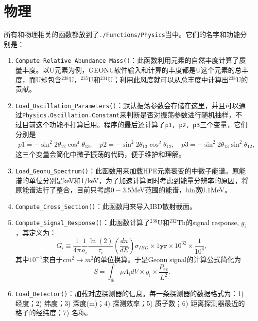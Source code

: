 		\section{物理}
			所有和物理相关的函数都放到了\texttt{./Functions/Physics}当中。它们的名字和功能分别是：
				\begin{enumerate}
					\item \texttt{Compute\_Relative\_Abundance\_Mass()}：此函数利用元素的自然丰度计算了质量丰度。以U元素为例，GEONU软件输入和计算的丰度都是U这个元素的总丰度，而U却包含${}^{238}$U，${}^{235}$U和${}^{234}$U；利用此风度就可以从总丰度中计算出${}^{238}$U的贡献。
					\item \texttt{Load\_Oscillation\_Parameters()}：默认振荡参数会存储在这里，并且可以通过\texttt{Physics.Oscillation.Constant}来判断是否对振荡参数进行随机抽样，不过目前这个功能不打算启用。程序的最后还计算了\texttt{p1, p2, p3}三个变量，它们分别是
						\begin{align}
							 p1 = -\sin^2 2\theta_{12} \cos^4 \theta_{13},
							 \quad
							 p2 = -\sin^2 2\theta_{13} \cos^2 \theta_{12},
							 \quad
							 p3 = - \sin^2 2\theta_{13} \sin^2 \theta_{12},
						\end{align}
					这三个变量会简化中微子振荡的代码，便于维护和理解。
					\item \texttt{Load\_Geonu\_Spectrum()}：此函数用来加载HPE元素衰变的中微子能谱。原能谱的单位分别是keV和1/keV，为了加速计算同时考虑到能量分辨率的原因，将原能谱进行了整合，目前只考虑$0-3.5$MeV范围的能谱，bin宽$0.1$MeV。
					\item \texttt{Compute\_Cross\_Section()}：此函数用来导入IBD散射截面。
					\item \texttt{Compute\_Signal\_Response()}：此函数计算了${}^{238}$U和${}^{232}$Th的signal response, $g_i$，其定义为：
						\begin{equation}
							G_i
							\equiv \frac{1}{4\pi}\frac{1}{a_i} \frac{\ln(2)}{\tau_i} \left(\frac{dn}{dE}\right) \sigma_{IBD} \times 1 \textbf{yr} \times 10^{32} \times \frac{1}{10^4},
						\end{equation}
					其中$10^{-4}$来自于$cm^2\rightarrow m^2$的单位换算。于是Geonu signal的计算公式简化为
						\begin{equation}
							S
							= \int_{\oplus} \rho A_i dV \times g_i \times \frac{P_{ee}}{L^2}.
						\end{equation}
					\item \texttt{Load\_Detector()}：加载对应探测器的信息。每一条探测器的数据格式为：1) 经度；2) 纬度；3) 深度(m)；4) 探测效率；5) 质子数；6) 距离探测器最近的格子的经纬度；7) 名称。
				\end{enumerate}
